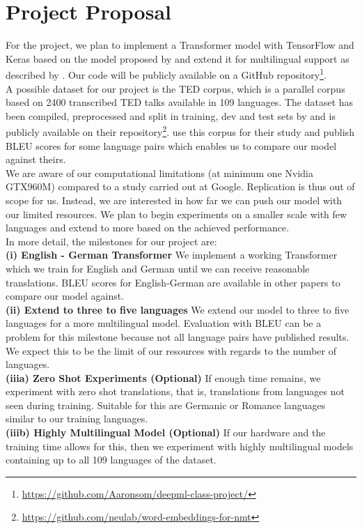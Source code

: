 \documentclass[article,accentcolor=tud8d,bibliography=totoc]{tudreport}
\begin{document}
\section{Project Proposal}
For the project, we plan to implement a Transformer model with TensorFlow and Keras based on the model proposed by \textcite{DBLP:journals/corr/VaswaniSPUJGKP17} and extend it for multilingual support as described by \textcite{DBLP:journals/corr/HaNW16,johnson2017google}.
Our code will be publicly available on a GitHub repository\footnote{\url{https://github.com/Aaronsom/deepml-class-project/}}.\\
A possible dataset for our project is the TED corpus, which is a parallel corpus based on 2400 transcribed TED talks available in 109 languages. 
The dataset has been compiled, preprocessed and split in training, dev and test sets by \textcite{Ye2018WordEmbeddings} and is publicly available on their repository\footnote{\url{https://github.com/neulab/word-embeddings-for-nmt}}.
\textcite{DBLP:journals/corr/abs-1903-00089} use this corpus for their study and publish BLEU scores \autocite{papineni2002bleu} for some language pairs which enables us to compare our model against theirs.\\
We are aware of our computational limitations (at minimum one Nvidia GTX960M) compared to a study carried out at Google.
Replication is thus out of scope for us.
Instead, we are interested in how far we can push our model with our limited resources.
We plan to begin experiments on a smaller scale with few languages and extend to more based on the achieved performance.
\\
In more detail, the milestones for our project are:\\
\textbf{(i) English - German Transformer} We implement a working Transformer which we train for English and German until we can receive reasonable translations. 
BLEU scores for English-German are available in other papers to compare our model against.\\
\textbf{(ii) Extend to three to five languages} We extend our model to three to five languages for a more multilingual model. 
Evaluation with BLEU can be a problem for this milestone because not all language pairs have published results. 
We expect this to be the limit of our resources with regards to the number of languages.\\
\textbf{(iiia) Zero Shot Experiments (Optional)} If enough time remains, we experiment with zero shot translations, that is, translations from languages not seen during training. Suitable for this are Germanic or Romance languages similar to our training languages.\\
\textbf{(iiib) Highly Multilingual Model (Optional)} If our hardware and the training time allows for this, then we experiment with highly multilingual models containing up to all 109 languages of the dataset.

\printbibliography[title=References, heading=bibliography]
   
\end{document}
